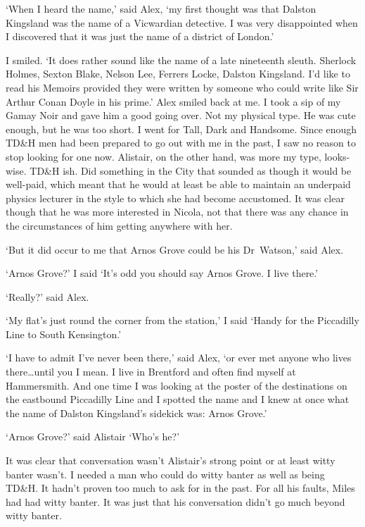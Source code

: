 
\twelverm
`When I heard the name,' said Alex, `my first thought was that
Dalston Kingsland was the name of a Vicwardian detective. I was very
disappointed when I discovered that it was just the name of a
district of London.'

I smiled. `It does rather sound like the name of a late nineteenth
sleuth. Sherlock Holmes, Sexton Blake, Nelson Lee, Ferrers Locke,
Dalston Kingsland. I'd like to read his {\twelvesl Memoirs\/}
provided they were written by someone who could write like Sir
Arthur Conan Doyle in his prime.' Alex smiled back at me. I took a
sip of my Gamay Noir and gave him a good going over. Not my physical
type. He was cute enough, but he was too short. I went for Tall,
Dark and Handsome. Since enough TD{\&}H men had been prepared to go
out with me in the past, I saw no reason to stop looking for one
now. Alistair, on the other hand, was more my type, looks-wise.
TD{\&}H {\twelveit ish}. Did something in the City that sounded as
though it would be well-paid, which meant that he would at least be
able to maintain an underpaid physics lecturer in the style to which
she had become accustomed. It was clear though that he was more interested in Nicola, not that there was any chance in the circumstances of him getting anywhere with her.

`But it did occur to me that Arnos Grove could be his Dr~Watson,'
said Alex.

`Arnos Grove?' I said `It's odd you should say Arnos Grove. I live
there.'

`Really?' said Alex.

`My flat's just round the corner from the station,' I said `Handy
for the Piccadilly Line to South Kensington.'

`I have to admit I've never been there,' said Alex, `or ever met
anyone who lives there\dots until you I mean. I live in Brentford
and often find myself at Hammersmith. And one time I was looking at
the poster of the destinations on the eastbound Piccadilly Line and
I spotted the name and I knew at once what the name of Dalston
Kingsland's sidekick was: Arnos Grove.'

`Arnos Grove?' said Alistair `Who's he?'

It was clear that conversation wasn't Alistair's
strong point or at least witty banter wasn't. I needed a man who
could do witty banter as well as being TD{\&}H. It
hadn't proven too much to ask for in the past. For all his faults,
Miles had had witty banter. It was just that his conversation didn't
go much beyond witty banter.

